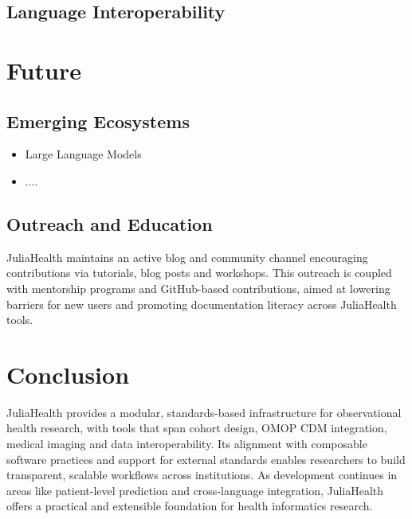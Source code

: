 \documentclass{article}
\begin{document}
\subsection{Language Interoperability}

\section{Future}

\subsection{Emerging Ecosystems}

\begin{itemize}
    \item Large Language Models
    \item ....
\end{itemize}

\subsection{Outreach and Education}
JuliaHealth maintains an active blog and community channel encouraging contributions via tutorials, blog posts and workshops. This outreach is coupled with mentorship programs and GitHub-based contributions, aimed at lowering barriers for new users and promoting documentation literacy across JuliaHealth tools.

\section{Conclusion}
JuliaHealth provides a modular, standards-based infrastructure for observational health research, with tools that span cohort design, OMOP CDM integration, medical imaging and data interoperability. Its alignment with composable software practices and support for external standards enables researchers to build transparent, scalable workflows across institutions. As development continues in areas like patient-level prediction and cross-language integration, JuliaHealth offers a practical and extensible foundation for health informatics research.
\end{document}
